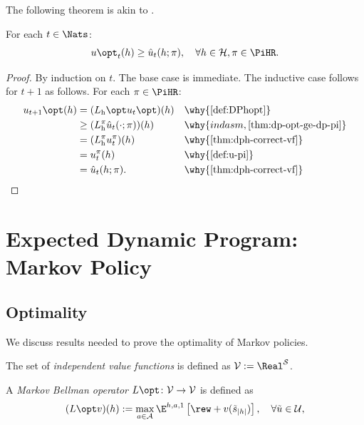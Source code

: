 The following theorem is akin to \citep[theorem~4.3.2]{Puterman2005}.
\begin{theorem}\label{thm:dph-opt-vf-opt}
For each $t\in \Nats$:
  \[
    u\opt_t(h)
    \ge 
    \hat{u}_t(h; \pi), \quad \forall h\in \mathcal{H}, \pi\in \PiHR.
  \]
\end{theorem}
\begin{proof}
  By induction on $t$. The base case is immediate. The inductive case follows for $t+1$ as follows. For each $\pi\in \PiHR$:
  \begin{align*}
    u_{t+1}\opt(h)
    &= (L_{\mathrm{h}}\opt u_t\opt)(h) && \why{\cref{def:DPhopt}} \\
    &\ge (L_{\mathrm{h}}^{\pi} \hat{u}_t(\cdot; \pi))(h) && \why{ind asm, \cref{thm:dp-opt-ge-dp-pi}} \\
    &= (L_{\mathrm{h}}^{\pi} u_t^{\pi})(h) && \why{\cref{thm:dph-correct-vf}} \\
    &= u_t^{\pi}(h) && \why{\cref{def:u-pi}} \\
    &= \hat{u}_t(h; \pi). && \why{\cref{thm:dph-correct-vf}} \\
  \end{align*}
\end{proof}

\section{Expected Dynamic Program: Markov Policy}

\subsection{Optimality}
We discuss results needed to prove the optimality of Markov policies. 

\begin{definition} \label{def:Values}
  The set of \emph{independent value functions} is defined as $\mathcal{V} := \Real^{\mathcal{S}}$.
\end{definition}

\begin{definition}\label{def:DPMopt}
A \emph{Markov Bellman operator} $L\opt\colon \mathcal{V} \to \mathcal{V}$ is defined as
\[
(L\opt  v)(h)  :=
\max_{a\in \mathcal{A}} \E^{h, a, 1} \left[ \rew + v(\tilde{s}_{|h|}) \right], \quad \forall \tilde{u} \in \mathcal{U},
\]
\end{definition}

